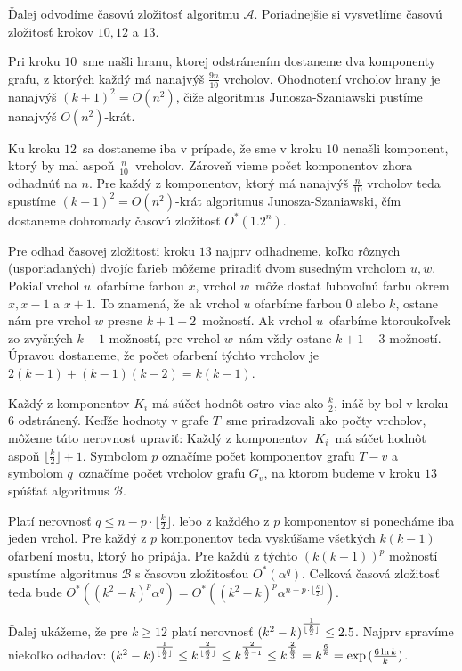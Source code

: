 Ďalej odvodíme časovú zložitosť algoritmu $\mathcal{A}$. Poriadnejšie si vysvetlíme časovú zložitosť
krokov $10, 12$ a $13$.

Pri kroku $10$ sme našli hranu, ktorej odstránením dostaneme dva komponenty
grafu, z ktorých každý má nanajvýš $\frac{9n}{10}$ vrcholov. Ohodnotení vrcholov hrany je nanajvýš
$(k+1)^2 = O(n^2)$, čiže algoritmus Junosza-Szaniawski pustíme nanajvýš $O(n^2)$-krát.

Ku kroku $12$ sa dostaneme iba v prípade, že sme v kroku $10$ nenašli komponent, ktorý by mal
aspoň $\frac{n}{10}$ vrcholov. Zároveň vieme počet komponentov zhora odhadnúť na $n$. Pre každý
z komponentov, ktorý má nanajvýš $\frac{n}{10}$ vrcholov teda spustíme $(k+1)^2 = O(n^2)$-krát
algoritmus Junosza-Szaniawski, čím dostaneme dohromady časovú zložitosť $O^*(1.2^n)$.

Pre odhad časovej zložitosti kroku $13$ najprv odhadneme, koľko rôznych (usporiadaných) dvojíc
farieb môžeme priradiť dvom susedným vrcholom $u, w$. 
Pokiaľ vrchol $u$ ofarbíme farbou $x$, vrchol $w$ môže dostať ľubovoľnú farbu okrem $x, x-1$ a $x + 1$.
To znamená, že ak vrchol $u$ ofarbíme farbou $0$ alebo $k$, ostane nám pre vrchol $w$ presne $k + 1 - 2$ možností.
Ak vrchol $u$ ofarbíme ktoroukoľvek zo zvyšných $k-1$ možností, pre vrchol $w$ nám vždy ostane $k + 1 - 3$
možností. Úpravou dostaneme, že počet ofarbení týchto vrcholov je $2(k-1) + (k-1)(k-2) = k(k-1)$.

Každý z komponentov $K_i$ má súčet hodnôt ostro viac ako $\frac{k}{2}$, ináč by bol v kroku $6$
odstránený. Keďže hodnoty v grafe $T$ sme priradzovali ako počty vrcholov, môžeme túto nerovnosť upraviť:
Každý z komponentov $K_i$ má súčet hodnôt aspoň $\lfloor \frac{k}{2} \rfloor + 1$. Symbolom $p$
označíme počet komponentov grafu $T - v$ a symbolom $q$ označíme počet vrcholov grafu $G_v$,
na ktorom budeme v kroku $13$ spúšťať algoritmus $\mathcal{B}$.

Platí nerovnosť $q \leq n - p \cdot \lfloor \frac{k}{2} \rfloor$, lebo z každého z $p$ komponentov
si ponecháme iba jeden vrchol. Pre každý z $p$ komponentov teda vyskúšame všetkých $k(k-1)$ ofarbení
mostu, ktorý ho pripája. Pre každú z týchto $(k(k-1))^p$ možností spustíme algoritmus $\mathcal{B}$
s časovou zložitosťou $O^*(\alpha^q)$. Celková časová zložitosť teda bude $O^*\left((k^2-k)^p \alpha^q\right) =
O^*\left((k^2 - k)^p \alpha^{n - p \cdot \lfloor \frac{k}{2} \rfloor}\right)$.

Ďalej ukážeme, že pre $k \ge 12$ platí nerovnosť $(k^2 - k)\strut^{\frac{1}{\lfloor \frac{k}{2} \rfloor}} \leq 2.5$.
Najprv spravíme niekoľko odhadov: $(k^2 - k)\strut^{\frac{1}{\lfloor \frac{k}{2} \rfloor}} \leq k\strut^{\frac{2}{\lfloor \frac{k}{2} \rfloor}} \leq
k\strut^{\frac{2}{\frac{k}{2} - 1}} \leq k\strut^{\frac{2}{\frac{k}{3}}} = k\strut^{\frac{6}{k}} = \exp{(\frac{6 \ln{k}}{k})}$.

